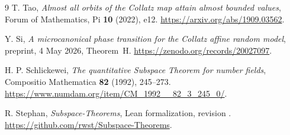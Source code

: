 \documentclass[11pt,a4paper]{article}
\begin{document}
\begin{thebibliography}{9}
T. Tao, \emph{Almost all orbits of the Collatz map attain almost
bounded values}, Forum of Mathematics, Pi \textbf{10} (2022), e12.
\url{https://arxiv.org/abs/1909.03562}.

Y. Si, \emph{A microcanonical phase transition for the Collatz affine
random model}, preprint,
4 May 2026, Theorem~H.
\url{https://zenodo.org/records/20027097}.

H. P. Schlickewei, \emph{The quantitative Subspace Theorem for number
fields}, Compositio Mathematica \textbf{82} (1992), 245--273.
\url{https://www.numdam.org/item/CM_1992__82_3_245_0/}.

R. Stephan, \emph{Subspace-Theorems}, Lean formalization, revision
.
\url{https://github.com/rwst/Subspace-Theorems}.
\end{thebibliography}
\end{document}
